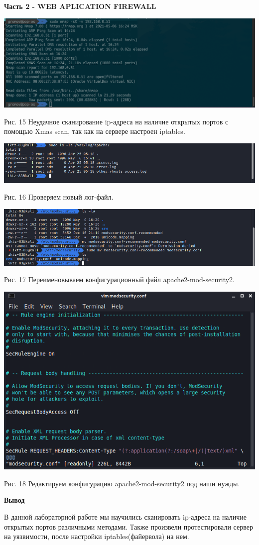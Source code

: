 \documentclass[a4paper,14pt]{extarticle}
\begin{document}
    \textbf{Часть 2 - WEB APLICATION FIREWALL}
    \begin{center}

        \singlespacing
        \includegraphics[scale=0.42]{pics/14.png}

        Рис. 15 Неудачное сканирование ip-адреса на наличие открытых портов с помощью Xmas scan, так как на сервере настроен iptables.
        \vspace{1ex}

        \includegraphics[scale=0.5]{pics/15.png}

        Рис. 16 Проверяем новый лог-файл.
        \vspace{1ex}

        \includegraphics[scale=0.5]{pics/16.png}

        Рис. 17 Переименовываем конфигурационный файл apache2-mod-security2.
        \vspace{1ex}

        \includegraphics[scale=0.6]{pics/17.png}

        Рис. 18 Редактируем конфигурацию apache2-mod-security2 под наши нужды.
    \end{center}

    \textbf{Вывод}

    В данной лабораторной работе мы научились сканировать ip-адреса на наличие открытых портов различными методами. Также произвели протестировали сервер на уязвимости, после настройки iptables(файервола) на нем. 
\end{document}
